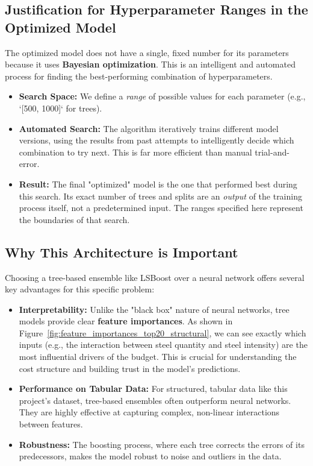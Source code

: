 \documentclass[11pt]{article}
\begin{document}
\subsection*{Justification for Hyperparameter Ranges in the Optimized Model}
The optimized model does not have a single, fixed number for its parameters because it uses \textbf{Bayesian optimization}. This is an intelligent and automated process for finding the best-performing combination of hyperparameters.
\begin{itemize}
    \item \textbf{Search Space:} We define a \textit{range} of possible values for each parameter (e.g., `[500, 1000]` for trees).
    \item \textbf{Automated Search:} The algorithm iteratively trains different model versions, using the results from past attempts to intelligently decide which combination to try next. This is far more efficient than manual trial-and-error.
    \item \textbf{Result:} The final "optimized" model is the one that performed best during this search. Its exact number of trees and splits are an \textit{output} of the training process itself, not a predetermined input. The ranges specified here represent the boundaries of that search.
\end{itemize}

\subsection*{Why This Architecture is Important}
Choosing a tree-based ensemble like LSBoost over a neural network offers several key advantages for this specific problem:
\begin{itemize}
    \item \textbf{Interpretability:} Unlike the "black box" nature of neural networks, tree models provide clear \textbf{feature importances}. As shown in Figure~\ref{fig:feature_importances_top20_structural}, we can see exactly which inputs (e.g., the interaction between steel quantity and steel intensity) are the most influential drivers of the budget. This is crucial for understanding the cost structure and building trust in the model's predictions.
    \item \textbf{Performance on Tabular Data:} For structured, tabular data like this project's dataset, tree-based ensembles often outperform neural networks. They are highly effective at capturing complex, non-linear interactions between features.
    \item \textbf{Robustness:} The boosting process, where each tree corrects the errors of its predecessors, makes the model robust to noise and outliers in the data.
\end{itemize}
\end{document}
